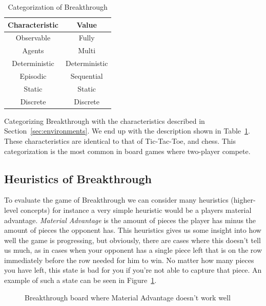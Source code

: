 \begin{table}[ht]
  \centering
  \begin{tabular}{|c|c|}\hline
    \textbf{Characteristic} & \textbf{Value} \\\hline
    Observable              & Fully          \\
    Agents                  & Multi          \\
    Deterministic           & Deterministic  \\
    Episodic                & Sequential     \\
    Static                  & Static         \\
    Discrete                & Discrete       \\\hline
  \end{tabular}
  \caption{Categorization of Breakthrough}
  \label{tab:breakthrough_cat}
\end{table}

Categorizing Breakthrough with the characteristics described in Section~\ref{sec:environments}. We end up with the description shown in Table~\ref{tab:breakthrough_cat}. These characteristics are identical to that of Tic-Tac-Toe, and chess. This categorization is the most common in board games where two-player compete.

\subsection{Heuristics of Breakthrough}

To evaluate the game of Breakthrough we can consider many heuristics (higher-level concepts) for instance a very simple heuristic would be a players material advantage. \textit{Material Advantage} is the amount of pieces the player has minus the amount of pieces the opponent has. This heuristics gives us some insight into how well the game is progressing, but obviously, there are cases where this doesn't tell us much, as in cases when your opponent has a single piece left that is on the row immediately before the row needed for him to win. No matter how many pieces you have left, this state is bad for you if you're not able to capture that piece. An example of such a state can be seen in Figure~\ref{fig:bt_h1_bad}.

\begin{figure}[]
  \centering
  \caption{Breakthrough board where Material Advantage doesn't work well}
  \label{fig:bt_h1_bad}
\end{figure}

